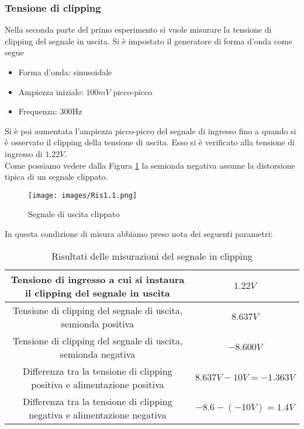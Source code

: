 \subsubsection{Tensione di clipping}
Nella seconda parte del primo esperimento si vuole misurare la tensione di clipping del segnale in uscita. Si è impostato il generatore di forma d'onda come segue
\begin{itemize}
    \item Forma d'onda: sinusoidale
    \item Ampiezza iniziale: $100mV$ picco-picco
    \item Frequenza: 300Hz
\end{itemize}
Si è poi aumentata l'ampiezza picco-picco del segnale di ingresso fino a quando si è osservato il clipping della tensione di uscita. Esso si è verificato alla tensione di ingresso di $1.22V$.\\
Come possiamo vedere dalla Figura \ref{fig:Ris1.1} la semionda negativa assume la distorsione tipica di un segnale clippato.
\begin{figure}[H]
    \centering
    \texttt{[image: images/Ris1.1.png]}
    \caption{Segnale di uscita clippato}
    \label{fig:Ris1.1}
\end{figure}
In questa condizione di misura abbiamo preso nota dei seguenti parametri:
\begin{table}[H]
    \centering
    \begin{tabular}{|c|c|}
    \hline
    Tensione di ingresso a cui si instaura il clipping del segnale in uscita & $1.22V$ \\\hline
    Tensione di clipping del segnale di uscita, semionda positiva & $8.637V$ \\\hline
    Tensione di clipping del segnale di uscita, semionda negativa & $-8.600V$ \\\hline
    Differenza tra la tensione di clipping positiva e alimentazione positiva & $8.637V-10V=-1.363V$ \\\hline
    Differenza tra la tensione di clipping negativa e alimentazione negativa & $-8.6-(-10V)=1.4V$ \\\hline
    \end{tabular}
    \caption{Risultati delle misurazioni del segnale in clipping}
    \label{tab:Ris1.1}
\end{table}